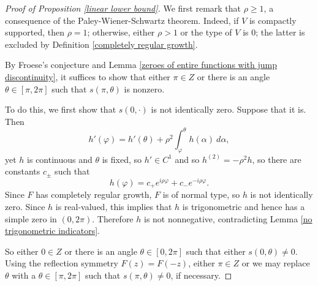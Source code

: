 \documentclass[reqno,12pt,letterpaper]{amsart}
\theoremstyle{definition}
\begin{document}
\begin{proof}[Proof of Proposition \ref{linear lower bound}]
We first remark that $\rho \geq 1$, a consequence of the Paley-Wiener-Schwartz theorem.
Indeed, if $V$ is compactly supported, then $\rho = 1$; otherwise, either $\rho > 1$ or the type of $V$ is $0$; the latter is excluded by Definition \ref{completely regular growth}.

By Froese's conjecture and Lemma \ref{zeroes of entire functions with jump discontinuity}, it suffices to show that either $\pi \in Z$ or there is an angle $\theta \in [\pi, 2\pi]$ such that $s(\pi, \theta)$ is nonzero.

To do this, we first show that $s(0, \cdot)$ is not identically zero. Suppose that it is. Then
$$
h'(\varphi) = h'(\theta) + \rho^2 \int_\varphi^\theta h(\alpha) ~d\alpha,
$$
yet $h$ is continuous and $\theta$ is fixed, so $h' \in C^1$ and so $h^{(2)} = -\rho^2 h$,
so there are constants $c_\pm$ such that
$$h(\varphi) = c_+e^{i\rho\varphi} + c_-e^{-i\rho\varphi}.$$
Since $F$ has completely regular growth, $F$ is of normal type, so $h$ is not identically zero.
Since $h$ is real-valued, this implies that $h$ is trigonometric and hence has a simple zero in $(0, 2\pi)$.
Therefore $h$ is not nonnegative, contradicting Lemma \ref{no trigonometric indicators}.


So either $0 \in Z$ or there is an angle $\theta \in [0, 2\pi]$ such that either $s(0, \theta) \neq 0$.
Using the reflection symmetry $F(z) = F(-z)$, either $\pi \in Z$ or we may replace $\theta$ with a $\theta \in [\pi, 2\pi]$ such that $s(\pi, \theta) \neq 0$, if necessary.
\end{proof}
\end{document}
